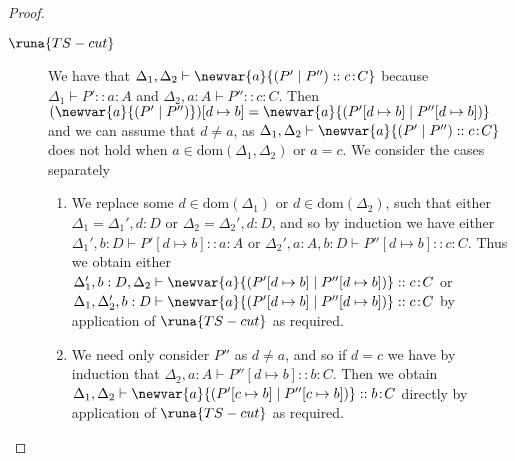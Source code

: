 \begin{lemma}
\begin{proof}
\begin{description}

\item[$\runa{TS-cut}$] We have that $\Delta_1,\Delta_2\vdash \newvar{a}{(P' \mid P'') :: c\!:\!C}$ because $\Delta_1\vdash P' :: a\!:\!A$ and $\Delta_2,a:A\vdash P'' :: c\!:\!C$. Then $(\newvar{a}{(P' \mid P'')})[d\mapsto b]=\newvar{a}{(P'[d\mapsto b] \mid P''[d\mapsto b])}$ and we can assume that $d\neq a$, as $\Delta_1,\Delta_2\vdash \newvar{a}{(P' \mid P'') :: c\!:\!C}$ does not hold when $a\in \text{dom}(\Delta_1,\Delta_2)$ or $a=c$. We consider the cases separately
\begin{enumerate}
    \item We replace some $d\in\text{dom}(\Delta_1)$ or $d\in\text{dom}(\Delta_2)$, such that either $\Delta_1=\Delta_1',d:D$ or $\Delta_2=\Delta_2',d:D$, and so by induction we have either $\Delta_1',b:D\vdash P'[d\mapsto b] :: a\!:\!A$ or $\Delta_2',a:A,b:D\vdash P''[d\mapsto b] :: c\!:\!C$. Thus we obtain either $\Delta_1',b:D,\Delta_2\vdash \newvar{a}{(P'[d\mapsto b] \mid P''[d\mapsto b])} :: c\!:\!C$ or $\Delta_1,\Delta_2',b:D\vdash \newvar{a}{(P'[d\mapsto b] \mid P''[d\mapsto b])} :: c\!:\!C$ by application of $\runa{TS-cut}$ as required.
    
    \item We need only consider $P''$ as $d\neq a$, and so if $d=c$ we have by induction that $\Delta_2,a:A\vdash P''[d\mapsto b] :: b\!:\!C$. Then we obtain $\Delta_1,\Delta_2\vdash \newvar{a}{(P'[c\mapsto b] \mid P''[c\mapsto b])} :: b\!:\!C$ directly by application of $\runa{TS-cut}$ as required. 
\end{enumerate}



\end{description}
\end{proof}
\end{lemma}
